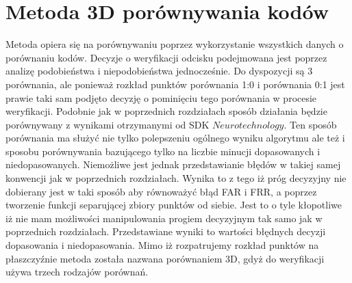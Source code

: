 \chapter{Metoda 3D porównywania kodów}
Metoda opiera się na porównywaniu poprzez wykorzystanie wszystkich danych o porównaniu kodów. Decyzje o weryfikacji odcisku podejmowana jest poprzez analizę podobieństwa i niepodobieństwa jednocześnie. Do dyspozycji są 3 porównania, ale ponieważ rozkład punktów porównania 1:0 i porównania 0:1 jest prawie taki sam podjęto decyzję o pominięciu tego porównania w procesie weryfikacji. Podobnie jak w poprzednich rozdziałach sposób działania będzie porównywany z wynikami otrzymanymi od SDK $Neurotechnology$. Ten sposób porównania ma służyć nie tylko polepszeniu ogólnego wyniku algorytmu ale też i sposobu porównywania bazującego tylko na liczbie minucji dopasowanych i niedopasowanych. Niemożliwe jest jednak przedstawianie błędów w takiej samej konwencji jak w poprzednich rozdziałach. Wynika to z tego iż próg decyzyjny nie dobierany jest w taki sposób aby równoważyć błąd FAR i FRR, a poprzez tworzenie funkcji separującej zbiory punktów od siebie. Jest to o tyle kłopotliwe iż nie mam możliwości manipulowania progiem decyzyjnym tak samo jak w poprzednich rozdziałach.
Przedstawiane wyniki to wartości błędnych decyzji dopasowania i niedopasowania. Mimo iż rozpatrujemy rozkład punktów na płaszczyźnie metoda została nazwana porównaniem 3D, gdyż do weryfikacji używa trzech rodzajów porównań.
